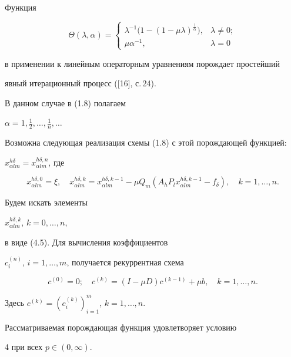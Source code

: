 \begin{exam}


Функция


$$


\Theta(\lambda, \alpha)=


\begin{cases}


\lambda^{-1}


\big (1-(1-\mu \lambda)^{\frac{1}{\alpha}} \big), & \lambda \ne 0;\\


\mu {\alpha}^{-1}, & \lambda=0 


\end{cases}


$$


в применении к линейным операторным уравнениям порождает простейший


явный итерационный процесс ([16], с.\,24).


В данном случае в (1.8) полагаем


$\alpha = 1, \frac{1}{2}, \dotsc, \frac{1}{n},\dotsc$


Возможна следующая реализация схемы (1.8) с этой порождающей функцией:


$x_{\alpha l m}^{h \delta}=x_{\alpha l m}^{h \delta, n}$, где


\begin{equation}


x_{\alpha l m}^{h \delta, 0}= \xi, \quad


x_{\alpha l m}^{h \delta, k}= x_{\alpha l m}^{h \delta, k-1}- \mu


Q_m(A_h P_l x_{\alpha l m}^{h \delta, k-1} - f_{\delta}),


\quad k=1, \dotsc, n.


\tag{4.8}


\end{equation}


Будем искать элементы


$x_{\alpha l m}^{h \delta, k}$, $k=0, \dotsc, n$,


в виде (4.5). Для вычисления коэффициентов


$c_i^{(n)}$, $i=1,\dotsc,m$, получается рекуррентная схема


$$


c^{(0)}=0; \quad


c^{(k)}= (I-\mu D) c^{(k-1)} + \mu b, \quad k=1,\dotsc,n.


$$


Здесь $c^{(k)}=(c_i^{(k)})_{i=1}^m$, $k=1,\dotsc,n$.


Рассматриваемая порождающая функция удовлетворяет условию


4 при всех $p \in (0, \infty)$.


\end{exam}





